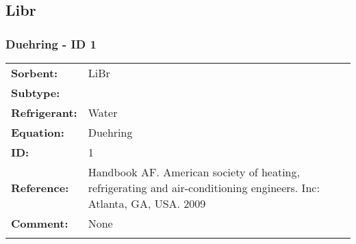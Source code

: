 \subsection{Libr }
%
\subsubsection{Duehring - ID 1}
%
\begin{tabular}[l]{|lp{11.5cm}|}
\hline
\addlinespace

\textbf{Sorbent:} & LiBr \\
\textbf{Subtype:} &  \\
\textbf{Refrigerant:} & Water \\
\textbf{Equation:} & Duehring \\
\textbf{ID:} & 1 \\
\textbf{Reference:} & Handbook AF. American society of heating, refrigerating and air-conditioning engineers. Inc: Atlanta, GA, USA. 2009 \\
\textbf{Comment:} & None \\

\addlinespace
\hline
\end{tabular}
\newline

